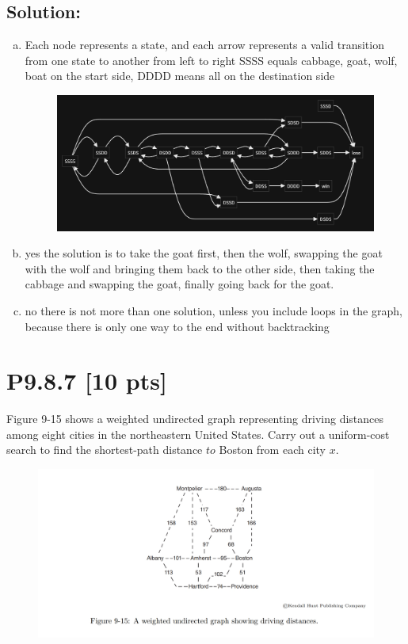 \documentclass[12pt]{article}
\begin{document}
\subsection*{\textbf{Solution:}}
\begin{enumerate}[(a)]
    \item Each node represents a state, and each arrow represents a valid transition from one state to another from left to right SSSS equals cabbage, goat, wolf, boat on the start side, DDDD means all on the destination side
    \begin{figure}[ht]
        \centering
        \includegraphics[width=0.75\linewidth]{4-6.png}
    \end{figure}
    \item yes the solution is to take the goat first, then the wolf, swapping the goat with the wolf and bringing them back to the other side, then taking the cabbage and swapping the goat, finally going back for the goat.

    \item no there is not more than one solution, unless you include loops in the graph, because there is only one way to the end without backtracking
    
\end{enumerate}


\newpage
\section*{\textbf{P9.8.7} [10 pts]}
 Figure 9-15 shows a weighted undirected graph representing driving distances among eight cities in the northeastern United States. Carry out a uniform-cost search to find the shortest-path distance $to$ Boston from each city $x$.
\begin{figure}[ht]
    \centering
    \includegraphics[width=0.75\linewidth]{9-15.png}
\end{figure}
\end{document}
